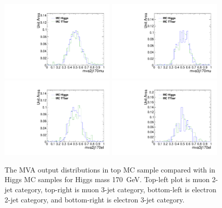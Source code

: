 \begin{figure}[!t]
  \centering
  \includegraphics[width=0.49\textwidth]{figs/cl-mva2j170mu-mvaTopvsHiggs.pdf}
  \includegraphics[width=0.49\textwidth]{figs/cl-mva3j170mu-mvaTopvsHiggs.pdf}
  \includegraphics[width=0.49\textwidth]{figs/cl-mva2j170el-mvaTopvsHiggs.pdf}
  \includegraphics[width=0.49\textwidth]{figs/cl-mva3j170el-mvaTopvsHiggs.pdf}
  \caption{\label{fig:mva:sigvsttbar-mva2j170}The MVA output
    distributions in top MC sample compared with in Higgs MC
    samples for Higgs mass 170~GeV. Top-left plot is muon 2-jet category,
    top-right is muon 3-jet category, bottom-left is electron 2-jet
    category, and bottom-right is electron 3-jet category. }
\end{figure}

